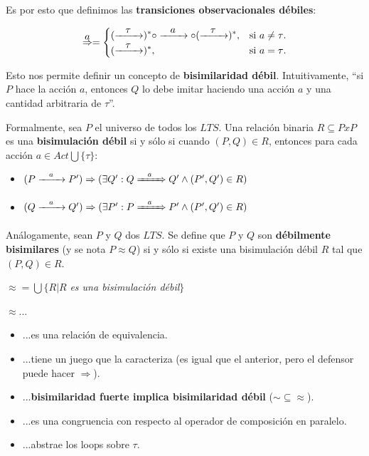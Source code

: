 \documentclass[]{article}
\begin{document}
Es por esto que definimos las \textbf{transiciones observacionales débiles}:

\begin{equation}
  \displaystyle \overset{\displaystyle a}{\displaystyle \Rightarrow}=\begin{cases}
   \displaystyle  (\xrightarrow{\hspace*{0.3cm} \displaystyle \tau \hspace*{0.3cm}})^*\circ \xrightarrow{\hspace*{0.3cm} \displaystyle a \hspace*{0.3cm}} \circ (\xrightarrow{\hspace*{0.3cm} \displaystyle \tau \hspace*{0.3cm}})^*, & \text{si $\displaystyle a\neq\tau$}.\\
 \displaystyle    (\xrightarrow{\hspace*{0.3cm} \displaystyle \tau \hspace*{0.3cm}})^*, & \text{si $\displaystyle a=\tau$}.
  \end{cases}
\end{equation}


Esto nos permite definir un concepto de \textbf{bisimilaridad débil}. Intuitivamente, ``si $P$ hace la acción $a$, entonces $Q$ lo debe imitar haciendo una acción $a$ y una cantidad arbitraria de $\tau$''.

Formalmente, sea $P$ el universo de todos los $LTS$. Una relación binaria $R\subseteq PxP$ es una \textbf{bisimulación débil} si y sólo si cuando $(P,Q)\in R$, entonces para cada acción $a\in Act\bigcup \{\tau\}$:
\begin{itemize}
	\item $(P\xrightarrow{\hspace*{0.3cm} a \hspace*{0.3cm}}P')\Rightarrow(\exists Q' : Q \xRightarrow{\hspace*{0.3cm} a \hspace*{0.3cm}}Q' \wedge (P',Q')\in R)$
	\item $(Q\xrightarrow{\hspace*{0.3cm} a \hspace*{0.3cm}}Q')\Rightarrow(\exists P' : P \xRightarrow{\hspace*{0.3cm} a \hspace*{0.3cm}}P' \wedge (P',Q')\in R)$
\end{itemize}

Análogamente, sean $P$ y $Q$ dos $LTS$. Se define que $P$ y $Q$ son \textbf{débilmente bisimilares} (y se nota $P \approx Q$) si y sólo si existe una bisimulación débil $R$ tal que $(P,Q)\in R$.
\begin{center}
	$\approx =\bigcup\{R|R$\textit{ es una bisimulación débil}$\}$
\end{center}

$\approx$...
\begin{itemize}
	\item ...es una relación de equivalencia.
	\item ...tiene un juego que la caracteriza (es igual que el anterior, pero el defensor puede hacer $\Rightarrow$).
	\item ...\textbf{bisimilaridad fuerte implica bisimilaridad débil} ($\sim \subseteq \approx$).
	\item ...es una congruencia con respecto al operador de composición en paralelo.
	\item ...abstrae los loops sobre $\tau$.
\end{itemize}
\end{document}
